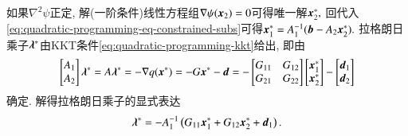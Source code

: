 如果$\nabla^2 \psi$正定, 解(一阶条件)线性方程组$\nabla \psi ({\bm{x}}_2) = 0$可得唯一解${\bm{x}}_2^*,$ 回代入\eqref{eq:quadratic-programming-eq-constrained-subs}可得${\bm{x}}_1^* = A_1^{-1} ( {\bm{b}} - A_2 {\bm{x}}_2^* ).$ 拉格朗日乘子${\bm{\lambda}}^*$由KKT条件\eqref{eq:quadratic-programming-kkt}给出, 即由
\begin{equation}
\label{eq:quadratic-programming-eq-lambda}
\begin{bmatrix} A_1 \\ A_2 \end{bmatrix} {\bm{\lambda}}^* = A {\bm{\lambda}}^* = -\nabla q({\bm{x}}^*) = - G {\bm{x}}^* - {\bm{d}} = - \begin{bmatrix} G_{11} & G_{12} \\ G_{21} & G_{22} \end{bmatrix} \begin{bmatrix} {\bm{x}}_1^* \\ {\bm{x}}_2^* \end{bmatrix} - \begin{bmatrix} {\bm{d}}_1 \\ {\bm{d}}_2 \end{bmatrix}
\end{equation}
确定. 解得拉格朗日乘子的显式表达
\begin{equation*}
{\bm{\lambda}}^* = -A_1^{-1} \left( G_{11} {\bm{x}}_1^* + G_{12} {\bm{x}}_2^* + {\bm{d}}_1 \right).
\end{equation*}

